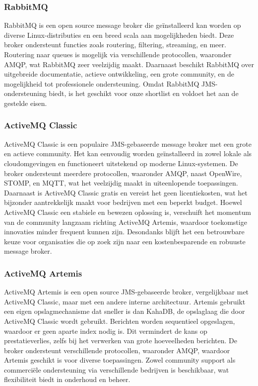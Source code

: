\subsubsection{RabbitMQ}
RabbitMQ is een open source message broker die geïnstalleerd kan worden op diverse Linux-distributies en een breed scala aan mogelijkheden biedt.
Deze broker ondersteunt functies zoals routering, filtering, streaming, en meer.
Routering naar queues is mogelijk via verschillende protocollen, waaronder AMQP, wat RabbitMQ zeer veelzijdig maakt.
Daarnaast beschikt RabbitMQ over uitgebreide documentatie, actieve ontwikkeling, een grote community, en de mogelijkheid tot professionele ondersteuning.
Omdat RabbitMQ JMS-ondersteuning biedt, is het geschikt voor onze shortlist en voldoet het aan de gestelde eisen.

\subsubsection{ActiveMQ Classic}
ActiveMQ Classic is een populaire JMS-gebaseerde message broker met een grote en actieve community.
Het kan eenvoudig worden geïnstalleerd in zowel lokale als cloudomgevingen en functioneert uitstekend op moderne Linux-systemen.
De broker ondersteunt meerdere protocollen, waaronder AMQP, naast OpenWire, STOMP, en MQTT, wat het veelzijdig maakt in uiteenlopende toepassingen.
Daarnaast is ActiveMQ Classic gratis en vereist het geen licentiekosten, wat het bijzonder aantrekkelijk maakt voor bedrijven met een beperkt budget.
Hoewel ActiveMQ Classic een stabiele en bewezen oplossing is, verschuift het momentum van de community langzaam richting ActiveMQ Artemis, 
waardoor toekomstige innovaties minder frequent kunnen zijn.
Desondanks blijft het een betrouwbare keuze voor organisaties die op zoek zijn naar een kostenbesparende en robuuste message broker.

\subsubsection{ActiveMQ Artemis}
ActiveMQ Artemis is een open source JMS-gebaseerde broker, vergelijkbaar met ActiveMQ Classic, maar met een andere interne architectuur.
Artemis gebruikt een eigen opslagmechanisme dat sneller is dan KahaDB, de opslaglaag die door ActiveMQ Classic wordt gebruikt.
Berichten worden sequentieel opgeslagen, waardoor er geen aparte index nodig is.
Dit vermindert de kans op prestatieverlies, zelfs bij het verwerken van grote hoeveelheden berichten.
De broker ondersteunt verschillende protocollen, waaronder AMQP, waardoor Artemis geschikt is voor diverse toepassingen.
Zowel community support als commerciële ondersteuning via verschillende bedrijven is beschikbaar, 
wat flexibiliteit biedt in onderhoud en beheer.

